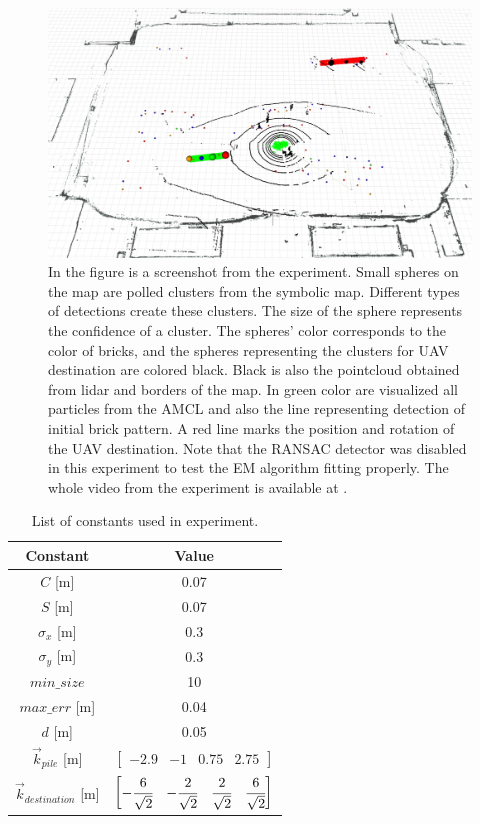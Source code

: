 \begin{figure}[H]
	\centering
	\includegraphics[scale=0.3]{fig/experiment}
	\caption[Experiment results]{In the figure is a screenshot from the experiment. Small spheres on the map are polled clusters from the symbolic map. Different types of detections create these clusters. The size of the sphere represents the confidence of a cluster. The spheres' color corresponds to the color of bricks, and the spheres representing the clusters for UAV destination are colored black. Black is also the pointcloud obtained from lidar and borders of the map. In green color are visualized all particles from the AMCL and also the line representing detection of initial brick pattern. A red line marks the position and rotation of the UAV destination. Note that the RANSAC detector was disabled in this experiment to test the EM algorithm fitting properly. The whole video from the experiment is available at \footnotemark.}
	\label{fig:experiment}
\end{figure}

\begin{table}[H]
	\centering
	\begin{tabular}{cc}
		\toprule
		Constant & Value \\
		\midrule
		$C$ [m] & 0.07   \\ 
		$S$ [m] & 0.07  \\
		$\sigma_x$ [m] & 0.3 \\ 
		$\sigma_y$ [m] & 0.3    \\ 
		$min\_size$ & 10 \\
		$max\_err$ [m] & 0.04 \\
		$d$ [m] & 0.05 \\
		$\vec{k}_{pile} $ [m] & $\begin{bmatrix}
			-2.9 & -1 & 0.75 & 2.75
		\end{bmatrix}$ \\
		$\vec{k}_{destination}$ [m] &
		$\begin{bmatrix}
			-\cfrac{6}{\sqrt{2}} &  -\cfrac{2}{\sqrt{2}} &  \cfrac{2}{\sqrt{2}} &  \cfrac{6}{\sqrt{2}}
		\end{bmatrix}$ \\
		\bottomrule
	\end{tabular}
	\caption{List of constants used in experiment.}
	\label{tab:constants}
\end{table}

